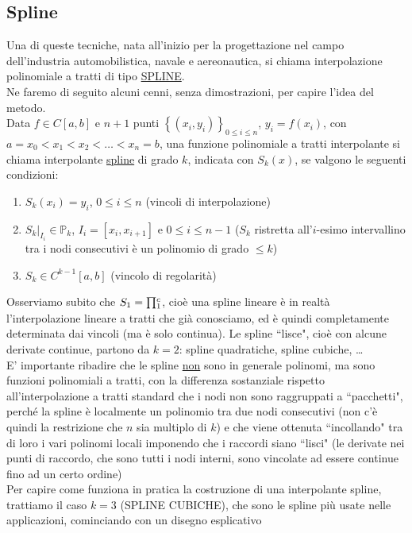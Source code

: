 \subsection{Spline}
Una di queste tecniche, nata all'inizio per la progettazione nel campo dell'industria automobilistica, navale e aereonautica, si chiama interpolazione polinomiale a tratti di tipo \uline{SPLINE}.\\
Ne faremo di seguito alcuni cenni, senza dimostrazioni, per capire l'idea del metodo. \\
Data $f \in C[a,b]$ e $n+1$ punti $\left\{ (x_i,y_i) \right\}_{0 \leq i \leq n}$, $y_i=f(x_i)$, con $a=x_0 < x_1 < x_2 <\dots<x_n=b$, una funzione polinomiale a tratti interpolante si chiama interpolante \uline{spline} di grado $k$, indicata con $S_k(x)$, se valgono le seguenti condizioni:
\begin{enumerate}
    \item $S_k(x_i)=y_i$, $0 \leq i \leq n$ (vincoli di interpolazione)
    \item $S_k \vert_{I_i} \in \mathbb{P}_k$, $I_i=[x_i,x_{i+1}]$ e $0 \leq i \leq n-1$ ($S_k$ ristretta all'$i$-esimo intervallino tra i nodi consecutivi è un polinomio di grado $\leq  k$)
    \item $S_k \in C^{k-1}[a,b]$ (vincolo di regolarità)
\end{enumerate}
Osserviamo subito che $S_1=\begin{matrix}\prod\end{matrix}_1^c$, cioè una spline lineare è in realtà l'interpolazione lineare a tratti che già conosciamo, ed è quindi completamente determinata dai vincoli (ma è solo continua). Le spline ``lisce", cioè con alcune derivate continue, partono da $k=2$: spline quadratiche, spline cubiche, \dots \\
E' importante ribadire che le spline \uline{non} sono in generale polinomi, ma sono funzioni polinomiali a tratti, con la differenza sostanziale rispetto all'interpolazione a tratti standard che i nodi non sono raggruppati a ``pacchetti", perché la spline è localmente un polinomio tra due nodi consecutivi (non c'è quindi la restrizione che $n$ sia multiplo di $k$) e che viene ottenuta ``incollando" tra di loro i vari polinomi locali imponendo che i raccordi siano ``lisci" (le derivate nei punti di raccordo, che sono tutti i nodi interni, sono vincolate ad essere continue fino ad un certo ordine) \\ Per capire come funziona in pratica la costruzione di una interpolante spline, trattiamo il caso $k=3$ (SPLINE CUBICHE), che sono le spline più usate nelle applicazioni, cominciando con un disegno esplicativo
